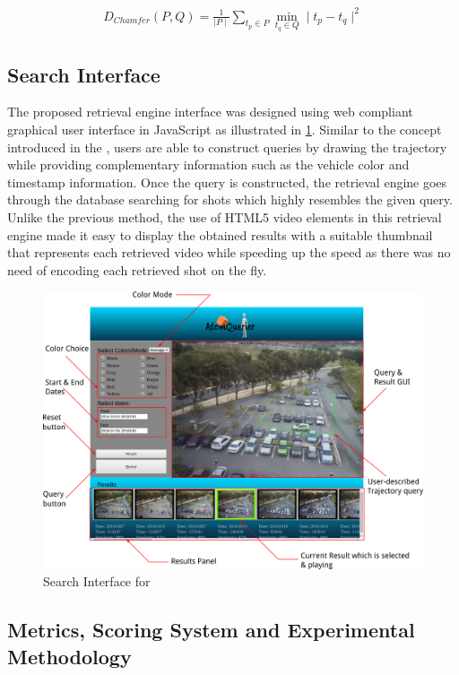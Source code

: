 \begin{align}
\label{eq:chamferDistance}
D_{Chamfer} (P,Q) = \frac{1}{\mid P \mid} \sum_{t_p \in P} \min_{t_q \in Q}  \mid t_p - t_q \mid^{2}
\end{align}

\subsection{Search Interface}
The proposed retrieval engine interface was designed using web compliant graphical user interface in JavaScript as illustrated in \ref{fig:versionTwoInterface}. 
Similar to the concept introduced in the \versionOne, users are able to construct queries by drawing the trajectory while providing complementary information such as the vehicle color and timestamp information.
Once the query is constructed, the retrieval engine goes through the database searching for shots which highly resembles the given query. 
Unlike the previous method, the use of HTML5 video elements in this retrieval engine made it easy to display the obtained results with a suitable thumbnail that represents each retrieved video while speeding up the speed as there was no need of encoding each retrieved shot on the fly.

\begin{figure}[hbt!]\centering
\includegraphics[width=.9\textwidth]{image/retrievalTwo/VISERinterface2.png}
\caption{Search Interface for \versionTwo}
\label{fig:versionTwoInterface}
\end{figure}

\subsection{Metrics, Scoring System and Experimental Methodology}

